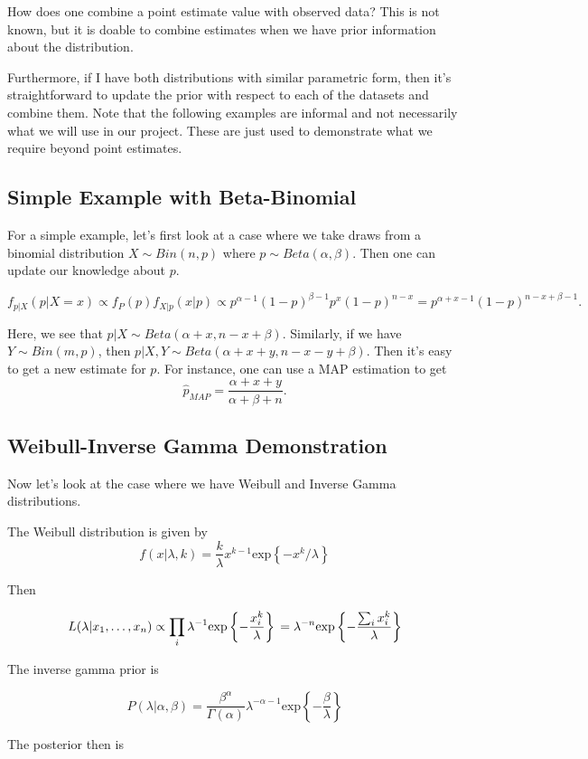 \documentclass[english]{article}
\numberwithin{equation}{section}
\begin{document}
How does one combine a point estimate value with observed data? This is not known, but it is doable to combine estimates when we have prior information about the distribution.

Furthermore, if I have both distributions with similar parametric form, then it's straightforward to update the prior with respect to each of the datasets and combine them. Note that the following examples are informal and not necessarily what we will use in our project. These are just used to demonstrate what we require beyond point estimates.

\subsection*{Simple Example with Beta-Binomial}
For a simple example, let's first look at a case where we take draws from a binomial distribution $X\sim Bin(n,p)$ where $p\sim Beta(\alpha,\beta)$. Then one can update our knowledge about $p$.

$$f_{p|X}(p|X=x)\propto f_P(p)f_{X|p}(x|p) \propto p^{\alpha-1}(1-p)^{\beta-1} p^x (1-p)^{n-x} = p^{\alpha+x-1} (1-p)^{n-x+\beta-1}.$$

Here, we see that $p|X\sim Beta(\alpha+x,n-x+\beta)$. Similarly, if we have $Y\sim Bin(m,p)$, then $p|{X,Y} \sim Beta(\alpha+x+y,n-x-y+\beta)$.  Then it's easy to get a new estimate for $p$. For instance, one can use a MAP estimation to get $$\hat{p}_{MAP}=\frac{\alpha+x+y}{\alpha+\beta+n}.$$

\subsection*{Weibull-Inverse Gamma Demonstration}
Now let's look at the case where we have Weibull and Inverse Gamma distributions.

The Weibull distribution is given by
$$f(x|\lambda, k)=\frac{k}{\lambda}x^{k-1}\text{exp}\left\{-x^k/\lambda \right\}$$

Then 

$$L(\lambda|x_1,\dots, x_n)\propto \prod_i \lambda^{-1}\text{exp}\left\{-\frac{x_i^k}{\lambda}\right\}\\
=\lambda^{-n}\text{exp}\left\{-\frac{\sum_i {x_i^k}}{\lambda}\right\}$$

The inverse gamma prior is

$$P(\lambda|\alpha,\beta)=\frac{\beta^\alpha}{\Gamma(\alpha)}\lambda^{-\alpha-1}\text{exp}\left\{-\frac{\beta}{\lambda}\right\}$$

The posterior then is
\end{document}
